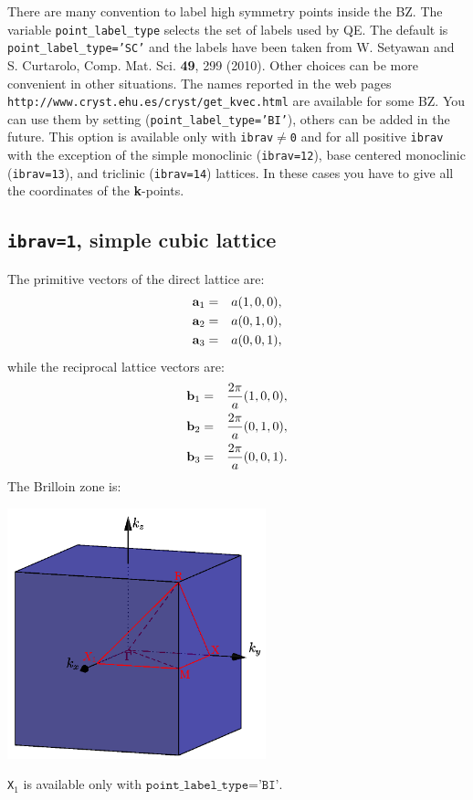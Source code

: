 \documentclass[12pt,a4paper]{article}
\begin{document}
There are many convention to label high symmetry
points inside the BZ. The variable \texttt{point\_label\_type} selects the
set of labels used by QE. The default is \texttt{point\_label\_type='SC'} and
the labels have been taken from W. Setyawan and S. Curtarolo, Comp. Mat. Sci.
{\bf 49}, 299 (2010). Other choices can be more convenient in other situations. 
The names reported in the web pages 
\texttt{http://www.cryst.ehu.es/cryst/get\_kvec.html}
are available for some BZ. You can use them by setting
(\texttt{point\_label\_type='BI'}), others can be added in the future.
This option is available only with \texttt{ibrav$\ne$0} and for 
all positive \texttt{ibrav} with the exception of the simple monoclinic
(\texttt{ibrav=12}), base centered monoclinic (\texttt{ibrav=13}), and
triclinic (\texttt{ibrav=14}) lattices. In these cases you have to
give all the coordinates of the {\bf k}-points.

\subsection{\texttt{ibrav=1}, simple cubic lattice}
The primitive vectors of the direct lattice are:
\begin{eqnarray}
{\bf a}_1 &=& a (1, 0, 0), \nonumber \\
{\bf a}_2 &=& a (0, 1, 0), \nonumber \\
{\bf a}_3 &=& a (0, 0, 1), \nonumber
\nonumber
\end{eqnarray}
while the reciprocal lattice vectors are:
\begin{eqnarray}
{\bf b}_1 &=& {2\pi \over a} (1, 0, 0), \nonumber \\
{\bf b}_2 &=& {2\pi \over a} (0, 1, 0), \nonumber \\
{\bf b}_3 &=& {2\pi \over a} (0, 0, 1). \nonumber
\nonumber
\end{eqnarray}
The Brilloin zone is:
\begin{center}
\includegraphics[width=7.5cm,angle=0]{images/cubic_bi.png}
\end{center}
\texttt{X$_1$} is available only with $\texttt{point\_label\_type='BI'}$.
\end{document}
